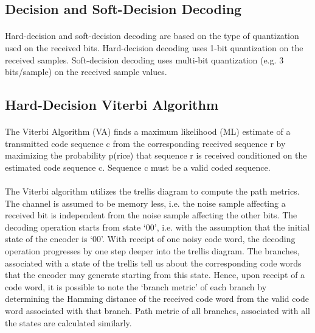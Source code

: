 \documentclass[14pt]{report}
\begin{document}
{\subsection{Decision and Soft-Decision Decoding}
\paragraph{} Hard-decision and soft-decision decoding are based on the type of quantization used on the received bits. Hard-decision decoding uses 1-bit quantization on the received samples. Soft-decision decoding uses multi-bit quantization (e.g. 3 bits/sample) on the received sample values.
\subsection{Hard-Decision Viterbi Algorithm}
\paragraph{} The Viterbi Algorithm (VA) finds a maximum likelihood (ML) estimate of a transmitted code  sequence c from the corresponding received sequence r by maximizing the probability p(rice) that sequence r is  received conditioned on the estimated code sequence c. Sequence c must be a valid coded sequence.
\paragraph{} The Viterbi algorithm utilizes the trellis diagram to compute the path metrics. The channel is assumed to be memory less, i.e. the noise sample affecting a received bit is independent from the noise sample affecting the other bits. The decoding operation starts from state ‘00’, i.e. with the assumption that the initial state of the encoder is ‘00’. With receipt of one noisy code word, the decoding operation progresses by one step deeper into the trellis diagram. The branches, associated with a state of the trellis tell us about the corresponding code words that the encoder may generate starting from this state. Hence, upon receipt of a code word, it is possible to note the ‘branch metric’ of each branch by determining the Hamming distance of the received code word from the valid code word associated with that branch. Path metric of all branches, associated with all the states are calculated similarly.
}
\end{document}
